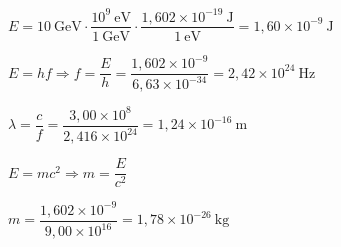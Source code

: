 \begin{solapartat}
 $E = 10\ \mathrm{GeV}\cdot\dfrac{10^{9}\ \mathrm{eV}}{1\ \mathrm{GeV}}\cdot\dfrac{1,602\times 10^{-19}\ \mathrm{J}}{1\ \mathrm{eV}} = 1,60\times 10^{-9}\ \mathrm{J}$

 $E = hf \Rightarrow f = \dfrac{E}{h} = \dfrac{1,602\times 10^{-9}}{6,63\times 10^{-34}} = 2,42\times 10^{24}\ \mathrm{Hz}$

 $\lambda = \dfrac{c}{f} = \dfrac{3,00\times 10^{8}}{2,416\times 10^{24}} = 1,24\times 10^{-16}\ \mathrm{m}$
\end{solapartat}

\begin{solapartat}
 $E = mc^2 \Rightarrow m = \dfrac{E}{c^2}$

 $m = \dfrac{1,602\times 10^{-9}}{9,00\times 10^{16}} = 1,78\times 10^{-26}\ \mathrm{kg}$
\end{solapartat}

